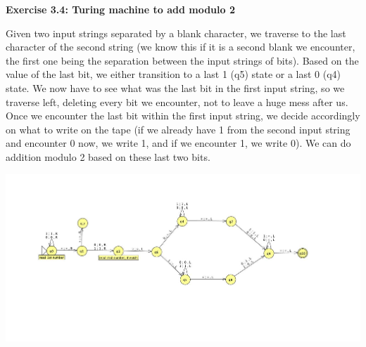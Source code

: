 \documentclass{article}
\begin{document}
\begin{framed}
    \noindent \textbf{Exercise 3.4: Turing machine to add modulo 2}

    \medskip

    Given two input strings separated by a blank character, we traverse to the last character of the second string (we know this if it is a second blank we encounter, the first one being the separation between the input strings of bits). Based on the value of the last bit, we either transition to a last 1 (q5) state or a last 0 (q4) state. We now have to see what was the last bit in the first input string, so we traverse left, deleting every bit we encounter, not to leave a huge mess after us. Once we encounter the last bit within the first input string, we decide accordingly on what to write on the tape (if we already have 1 from the second input string and encounter 0 now, we write 1, and if we encounter 1, we write 0). We can do addition modulo 2 based on these last two bits.
    
    \begin{center}
        \includegraphics[width=1.1\textwidth]{images/3.4TM.jpg}
    \end{center}


\end{framed}
\end{document}
